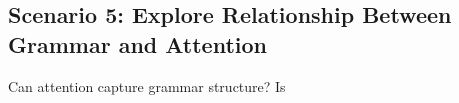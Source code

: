\subsection{Scenario 5: Explore Relationship Between Grammar and Attention}
Can attention capture grammar structure? Is 
